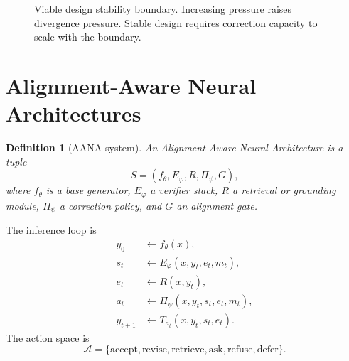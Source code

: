 \documentclass[11pt]{article}
\newtheorem{definition}{Definition}
\begin{document}
\begin{figure}[t]
\centering
{}
\caption{Viable design stability boundary. Increasing pressure raises divergence pressure. Stable design requires correction capacity to scale with the boundary.}
\label{fig:phase-boundary}
\end{figure}

\section{Alignment-Aware Neural Architectures}

\begin{definition}[AANA system]
An Alignment-Aware Neural Architecture is a tuple
\begin{equation}
S=(f_\theta,E_\varphi,R,\Pi_\psi,G),
\end{equation}
where $f_\theta$ is a base generator, $E_\varphi$ a verifier stack, $R$ a retrieval or grounding module, $\Pi_\psi$ a correction policy, and $G$ an alignment gate.
\end{definition}

The inference loop is
\begin{align}
y_0 &\leftarrow f_\theta(x),\\
s_t &\leftarrow E_\varphi(x,y_t,e_t,m_t),\\
e_t &\leftarrow R(x,y_t),\\
a_t &\leftarrow \Pi_\psi(x,y_t,s_t,e_t,m_t),\\
y_{t+1}&\leftarrow T_{a_t}(x,y_t,s_t,e_t).
\end{align}
The action space is
\begin{equation}
\mathcal{A}=\{\mathrm{accept},\mathrm{revise},\mathrm{retrieve},\mathrm{ask},\mathrm{refuse},\mathrm{defer}\}.
\end{equation}
\end{document}
